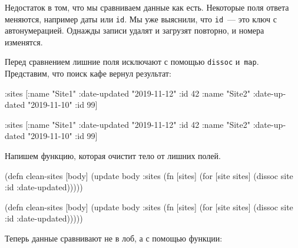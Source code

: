 \fi

Недостаток в том, что мы сравниваем данные как есть. Некоторые поля ответа
меняются, например даты или \verb|id|. Мы уже выяснили, что \verb|id|~--- это
ключ с автонумерацией. Однажды записи удалят и загрузят повторно, и номера
изменятся.

Перед сравнением лишние поля исключают с помощью \verb|dissoc|
и~\verb|map|. Представим, что поиск кафе вернул результат:

\ifx\devicetype\mobile

\begin{english}
  \begin{clojure}
{:sites [{:name "Site1"
          :date-updated "2019-11-12"
          :id 42}
         {:name "Site2"
          :date-updated "2019-11-10"
          :id 99}]}
  \end{clojure}
\end{english}

\else

\begin{english}
  \begin{clojure}
{:sites [{:name "Site1" :date-updated "2019-11-12" :id 42}
         {:name "Site2" :date-updated "2019-11-10" :id 99}]}
  \end{clojure}
\end{english}

\fi


\noindent
Напишем функцию, которая очистит тело от лишних полей.

\ifx\devicetype\mobile

\begin{english}
  \begin{clojure}
(defn clean-sites [body]
 (update body :sites
  (fn [sites]
   (for [site sites]
    (dissoc site :id :date-updated)))))
  \end{clojure}
\end{english}

\else

\begin{english}
  \begin{clojure}
(defn clean-sites [body]
  (update body :sites
          (fn [sites]
            (for [site sites]
              (dissoc site :id :date-updated)))))
  \end{clojure}
\end{english}

\fi

\noindent
Теперь данные сравнивают не в лоб, а с помощью функции:

